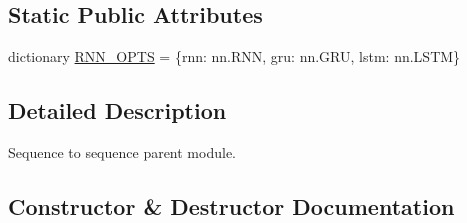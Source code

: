 \subsection*{Static Public Attributes}
\begin{DoxyCompactItemize}
\item 
dictionary \hyperlink{classparlai_1_1agents_1_1seq2seq_1_1modules_1_1Seq2seq_a3962ff3f0654a2808f13d677c7192fa2}{R\+N\+N\+\_\+\+O\+P\+TS} = \{\textquotesingle{}rnn\textquotesingle{}\+: nn.\+R\+NN, \textquotesingle{}gru\textquotesingle{}\+: nn.\+G\+RU, \textquotesingle{}lstm\textquotesingle{}\+: nn.\+L\+S\+TM\}
\end{DoxyCompactItemize}


\subsection{Detailed Description}
\begin{DoxyVerb}Sequence to sequence parent module.
\end{DoxyVerb}
 

\subsection{Constructor \& Destructor Documentation}
\mbox{\label{classparlai_1_1agents_1_1seq2seq_1_1modules_1_1Seq2seq_a8e8ad02405bcaf384e154a0e238fc10d}} 

